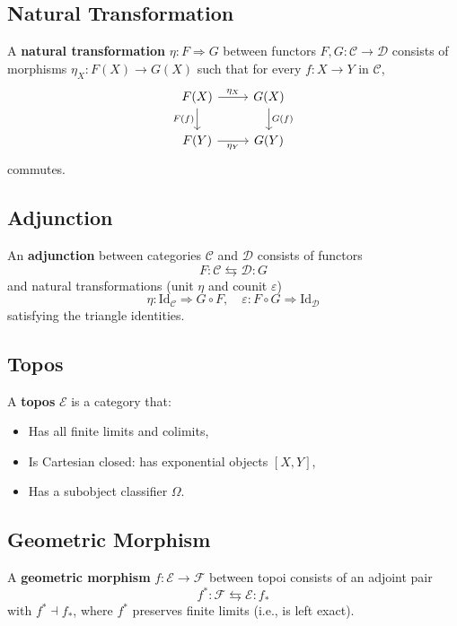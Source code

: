 \documentclass{article}
\begin{document}
\subsection{Natural Transformation}
A \textbf{natural transformation} $\eta: F \Rightarrow G$ between functors $F, G: \mathcal{C} \to \mathcal{D}$ consists of morphisms $\eta_X: F(X) \to G(X)$ such that for every $f: X \to Y$ in $\mathcal{C}$,
\[
\begin{tikzcd}
F(X) \arrow[r, "\eta_X"] \arrow[d, "F(f)"'] & G(X) \arrow[d, "G(f)"] \\
F(Y) \arrow[r, "\eta_Y"'] & G(Y)
\end{tikzcd}
\]
commutes.

\subsection{Adjunction}
An \textbf{adjunction} between categories $\mathcal{C}$ and $\mathcal{D}$ consists of functors
\[
F: \mathcal{C} \leftrightarrows \mathcal{D} : G
\]
and natural transformations (unit $\eta$ and counit $\varepsilon$)
\[
\eta: \mathrm{Id}_{\mathcal{C}} \Rightarrow G \circ F, \quad \varepsilon: F \circ G \Rightarrow \mathrm{Id}_{\mathcal{D}}
\]
satisfying the triangle identities.

\subsection{Topos}
A \textbf{topos} $\mathcal{E}$ is a category that:
\begin{itemize}
  \item Has all finite limits and colimits,
  \item Is Cartesian closed: has exponential objects $[X,Y]$,
  \item Has a subobject classifier $\Omega$.
\end{itemize}

\subsection{Geometric Morphism}
A \textbf{geometric morphism} $f: \mathcal{E} \to \mathcal{F}$ between topoi consists of an adjoint pair
\[
f^*: \mathcal{F} \leftrightarrows \mathcal{E} : f_*
\]
with $f^* \dashv f_*$, where $f^*$ preserves finite limits (i.e., is left exact).

\newpage
\end{document}
